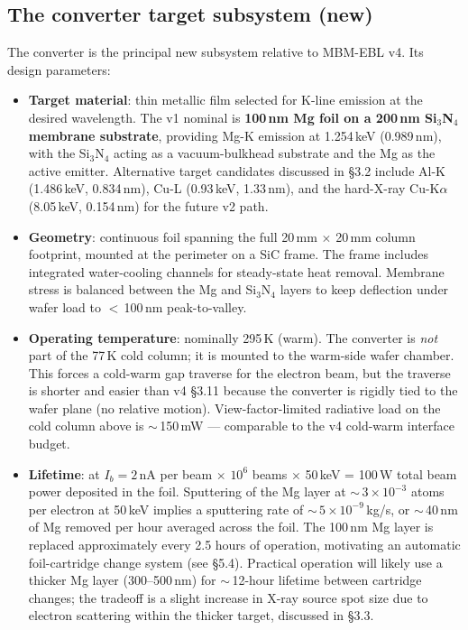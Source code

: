 \documentclass[11pt,letterpaper]{article}
\begin{document}
\subsection{The converter target subsystem (new)}

The converter is the principal new subsystem relative to MBM-EBL v4. Its design parameters:

\begin{itemize}[leftmargin=1.6em]
  \item \textbf{Target material}: thin metallic film selected for K-line emission at the desired wavelength. The v1 nominal is \textbf{100\,nm Mg foil on a 200\,nm Si$_3$N$_4$ membrane substrate}, providing Mg-K emission at 1.254\,keV (0.989\,nm), with the Si$_3$N$_4$ acting as a vacuum-bulkhead substrate and the Mg as the active emitter. Alternative target candidates discussed in \S 3.2 include Al-K (1.486\,keV, 0.834\,nm), Cu-L (0.93\,keV, 1.33\,nm), and the hard-X-ray Cu-K$\alpha$ (8.05\,keV, 0.154\,nm) for the future v2 path.
  \item \textbf{Geometry}: continuous foil spanning the full 20\,mm $\times$ 20\,mm column footprint, mounted at the perimeter on a SiC frame. The frame includes integrated water-cooling channels for steady-state heat removal. Membrane stress is balanced between the Mg and Si$_3$N$_4$ layers to keep deflection under wafer load to $<$\,100\,nm peak-to-valley.
  \item \textbf{Operating temperature}: nominally 295\,K (warm). The converter is \textit{not} part of the 77\,K cold column; it is mounted to the warm-side wafer chamber. This forces a cold-warm gap traverse for the electron beam, but the traverse is shorter and easier than v4 \S 3.11 because the converter is rigidly tied to the wafer plane (no relative motion). View-factor-limited radiative load on the cold column above is $\sim$\,150\,mW --- comparable to the v4 cold-warm interface budget.
  \item \textbf{Lifetime}: at $I_b = 2$\,nA per beam $\times$ $10^6$ beams $\times$ 50\,keV = 100\,W total beam power deposited in the foil. Sputtering of the Mg layer at $\sim$\,$3 \times 10^{-3}$ atoms per electron at 50\,keV implies a sputtering rate of $\sim$\,$5 \times 10^{-9}$\,kg/s, or $\sim$\,40\,nm of Mg removed per hour averaged across the foil. The 100\,nm Mg layer is replaced approximately every 2.5 hours of operation, motivating an automatic foil-cartridge change system (see \S 5.4). Practical operation will likely use a thicker Mg layer (300--500\,nm) for $\sim$\,12-hour lifetime between cartridge changes; the tradeoff is a slight increase in X-ray source spot size due to electron scattering within the thicker target, discussed in \S 3.3.

\end{itemize}
\end{document}
